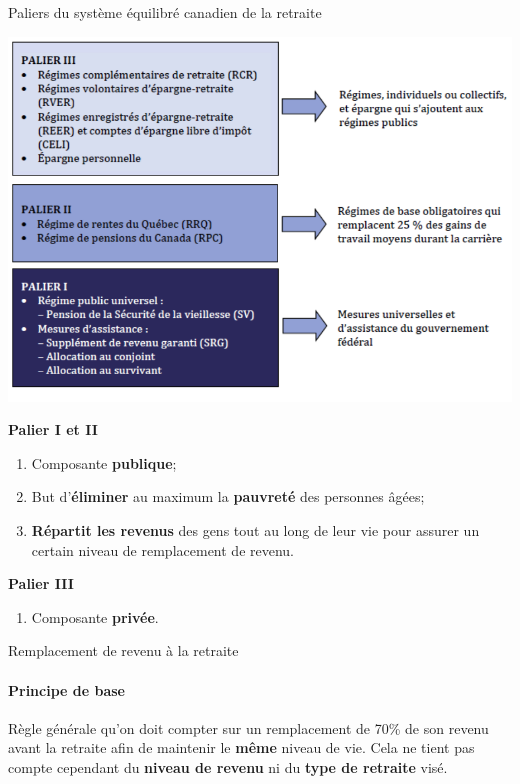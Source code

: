\documentclass[10pt, french]{article}
\begin{document}
\begin{multicols*}{3}
\begin{conceptgen}{Paliers du système équilibré canadien de la retraite}
\centerline{\includegraphics[scale=0.25]{src/ACT-1005/retraite-paliers.png}}

\textbf{Palier I et II}
\begin{enumerate}[leftmargin = *]
	\item	Composante \textbf{publique};
	\item	But d'\textbf{éliminer} au maximum la \textbf{pauvreté} des personnes âgées;
	\item	\textbf{Répartit les revenus} des gens tout au long de leur vie pour assurer un certain niveau de remplacement de revenu.
\end{enumerate}

\textbf{Palier III}
\begin{enumerate}[leftmargin = *]
	\item	Composante \textbf{privée}.
\end{enumerate}
\end{conceptgen}

\begin{conceptgen}{Remplacement de revenu à la retraite}
\paragraph{Principe de base}Règle générale qu'on doit compter sur un remplacement de 70\% de son revenu avant la retraite afin de maintenir le \textbf{même} niveau de vie. Cela ne tient pas compte cependant du \textbf{niveau de revenu} ni du \textbf{type de retraite} visé.
\\


\end{conceptgen}
\end{multicols*}
\end{document}
